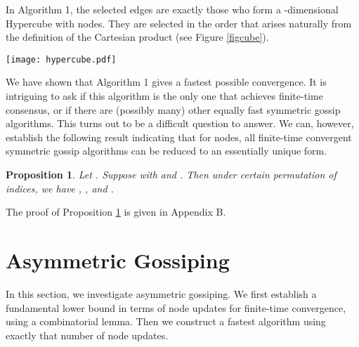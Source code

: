 \documentclass[a4paper, 11pt]{article}
\newtheorem{proposition}{Proposition}
\begin{document}
\medskip


In Algorithm 1, the selected edges are exactly those who form a  -dimensional Hypercube with  nodes. They are selected in the order that arises naturally from the definition of the Cartesian product (see Figure \ref{figcube}).

\begin{figure*}[t]
\begin{center}
\texttt{[image: hypercube.pdf]}
\caption{An illustration of Algorithm 1 with , , and  nodes. The edges selected in the same step are marked with the same line style. The algorithm builds hypercubes  ,   , and . }\label{figcube}
\end{center}
\end{figure*}


 We have shown that Algorithm 1 gives a fastest possible convergence. It is intriguing to ask if this algorithm is the only one that achieves finite-time consensus, or if there are (possibly many) other equally fast symmetric gossip algorithms. This turns out to be a difficult question to answer. We can, however, establish the following result indicating that for  nodes, all finite-time convergent symmetric gossip algorithms can be reduced to an essentially unique form.

\medskip

\begin{proposition}\label{unique}
Let . Suppose  with  and .  Then under certain permutation of indices, we have , ,  and .
\end{proposition}

\medskip

The proof of Proposition \ref{unique} is given in Appendix B.










\section{Asymmetric Gossiping}\label{Sec:Asymmetric}
In this section, we investigate  asymmetric gossiping.  We first establish a fundamental lower bound in terms of node updates for finite-time convergence,  using a combinatorial lemma. Then we construct a fastest algorithm using exactly that number of node updates.
\end{document}
